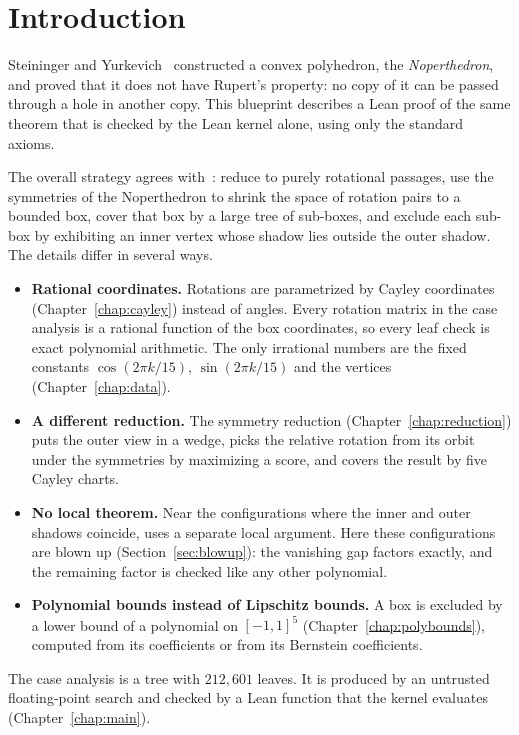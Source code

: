 \chapter{Introduction}

Steininger and Yurkevich~\cite{polyhedron.without.rupert} constructed a convex
polyhedron, the \emph{Noperthedron}, and proved that it does not have Rupert's
property: no copy of it can be passed through a hole in another copy. This blueprint
describes a Lean proof of the same theorem that is checked by the Lean kernel alone,
using only the standard axioms.

The overall strategy agrees with~\cite{polyhedron.without.rupert}: reduce to purely
rotational passages, use the symmetries of the Noperthedron to shrink the space of
rotation pairs to a bounded box, cover that box by a large tree of sub-boxes, and
exclude each sub-box by exhibiting an inner vertex whose shadow lies outside the outer
shadow. The details differ in several ways.

\begin{itemize}
\item \textbf{Rational coordinates.} Rotations are parametrized by Cayley
  coordinates (Chapter~\ref{chap:cayley}) instead of angles. Every rotation matrix
  in the case analysis is a rational function of the box coordinates, so every leaf
  check is exact polynomial arithmetic. The only irrational numbers are the fixed
  constants $\cos(2\pi k/15)$, $\sin(2\pi k/15)$ and the vertices
  (Chapter~\ref{chap:data}).
\item \textbf{A different reduction.} The symmetry reduction
  (Chapter~\ref{chap:reduction}) puts the outer view in a wedge, picks the relative
  rotation from its orbit under the symmetries by maximizing a score, and covers the
  result by five Cayley charts.
\item \textbf{No local theorem.} Near the configurations where the inner and outer
  shadows coincide, \cite{polyhedron.without.rupert} uses a separate local argument.
  Here these configurations are blown up (Section~\ref{sec:blowup}): the vanishing
  gap factors exactly, and the remaining factor is checked like any other polynomial.
\item \textbf{Polynomial bounds instead of Lipschitz bounds.} A box is excluded by
  a lower bound of a polynomial on $[-1,1]^5$ (Chapter~\ref{chap:polybounds}), computed
  from its coefficients or from its Bernstein coefficients.
\end{itemize}

The case analysis is a tree with $212{,}601$ leaves. It is produced by an untrusted
floating-point search and checked by a Lean function that the kernel evaluates
(Chapter~\ref{chap:main}).
